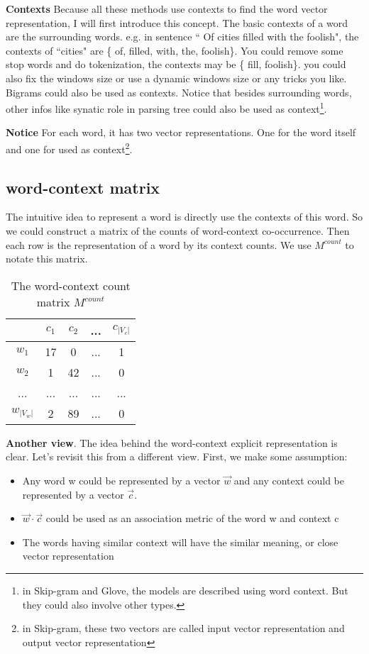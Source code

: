 \documentclass{article} %
\begin{document}
\textbf{Contexts} Because all these methods use contexts to find the word vector representation, I will first introduce this concept. The basic contexts of a word are the surrounding words. e.g. in sentence `` Of cities filled with the foolish", the contexts of ``cities" are \{ of, filled, with, the, foolish\}. You could remove some stop words and do tokenization, the contexts may be \{ fill, foolish\}. you could also fix the windows size or use a dynamic windows size or any tricks you like. Bigrams could also be used as contexts. Notice that besides surrounding words, other infos like synatic role in parsing tree could also be used as context\footnote{in Skip-gram and Glove, the models are described using word context. But they could also involve other types.}.

\textbf{Notice}  For each word, it has two vector representations. One for the word itself and one for used as context\footnote{in Skip-gram, these two vectors are called input vector representation and output vector representation}. 
\subsection{word-context matrix}
The intuitive idea to represent a word is directly use the contexts of this word. So we could construct a matrix of the counts of word-context co-occurrence. Then each row is the representation of a word by its context counts. We use $M^{count}$ to notate this matrix.

\begin{table}[ht]
\caption{The word-context count matrix $M^{count}$}
\centering 
\begin{tabular}{c c c c c} 
\hline
 & $c_1$ & $c_2$ & ... & $c_{|V_c|}$ \\
\hline %
$w_1$ & 17 & 0 & ... & 1\\
$w_2$ & 1 & 42 & ... & 0\\
... & ... & ... & ... & ...\\
$w_{|V_w|}$ & 2 & 89 & ... & 0 
\end{tabular}
\label{table:wcmatrix} 
\end{table}


\textbf{Another view}. The idea behind the word-context explicit representation is clear. Let's revisit this from a different view. First, we make some assumption:
\begin{itemize}
\item Any word w could be represented by a vector $\vec{w}$ and any context could be represented by a vector $\vec{c}$. 
\item $\vec{w}\cdot\vec{c}$ could be used as an association metric of the word w and context c
\item The words having similar context will have the similar meaning, or close vector representation
 \end{itemize} 
 
\end{document}
